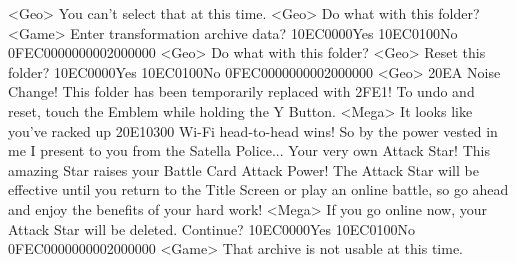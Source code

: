 <Geo> You can't select that at this time. 
<Geo> Do what with this folder? 
<Game> Enter transformation archive data? {10}{EC}{00}{00}Yes {10}{EC}{01}{00}No {0F}{EC}{00}{00}{00}{00}{02}{00}{00}{00}
<Geo> Do what with this folder? 
<Geo> Reset this folder? {10}{EC}{00}{00}Yes {10}{EC}{01}{00}No {0F}{EC}{00}{00}{00}{00}{02}{00}{00}{00}
<Geo> {20}{EA} Noise Change! 
This folder has been temporarily replaced with {2F}{E1}! 
To undo and reset, touch the Emblem while holding the Y Button. 
<Mega> It looks like you've racked up {20}{E1}{03}{00} Wi-Fi head-to-head wins! 
So by the power vested in me I present to you from the Satella Police... 
Your very own Attack Star! 
This amazing Star raises your Battle Card Attack Power! 
The Attack Star will be effective until you return to the Title Screen or play 
an online battle, so go ahead and enjoy the benefits of your hard work! 
<Mega> If you go online now, your Attack Star will be deleted. Continue? {10}{EC}{00}{00}Yes {10}{EC}{01}{00}No {0F}{EC}{00}{00}{00}{00}{02}{00}{00}{00}
<Game> That archive is not usable at this time. 
